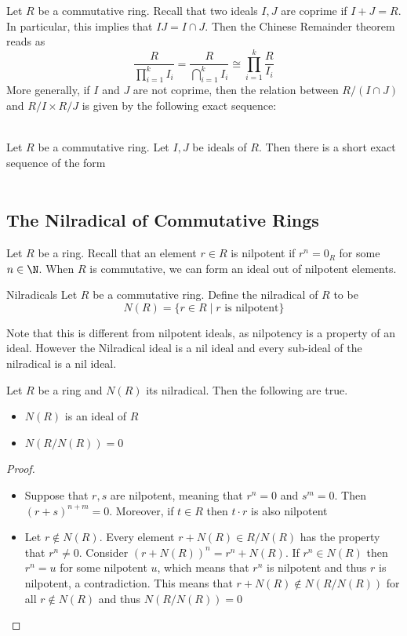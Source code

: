 \documentclass[a4paper]{article}
\begin{document}
Let $R$ be a commutative ring. Recall that two ideals $I,J$ are coprime if $I+J=R$. In particular, this implies that $IJ=I\cap J$. Then the Chinese Remainder theorem reads as $$\frac{R}{\prod_{i=1}^kI_i}=\frac{R}{\bigcap_{i=1}^kI_i}\cong\prod_{i=1}^k\frac{R}{I_i}$$ More generally, if $I$ and $J$ are not coprime, then the relation between $R/(I\cap J)$ and $R/I\times R/J$ is given by the following exact sequence: 

\begin{lmm}{}{}\\
Let $R$ be a commutative ring. Let $I,J$ be ideals of $R$. Then there is a short exact sequence of the form \\
\\
\end{lmm}

\subsection{The Nilradical of Commutative Rings}
Let $R$ be a ring. Recall that an element $r\in R$ is nilpotent if $r^n=0_R$ for some $n\in\N$. When $R$ is commutative, we can form an ideal out of nilpotent elements. 

\begin{defn}{Nilradicals}{} Let $R$ be a commutative ring. Define the nilradical of $R$ to be $$N(R)=\{r\in R\;|\;r\text{ is nilpotent}\}$$
\end{defn}

Note that this is different from nilpotent ideals, as nilpotency is a property of an ideal. However the Nilradical ideal is a nil ideal and every sub-ideal of the nilradical is a nil ideal. 

\begin{prp}{}{} Let $R$ be a ring and $N(R)$ its nilradical. Then the following are true. 
\begin{itemize}
\item $N(R)$ is an ideal of $R$
\item $N(R/N(R))=0$
\end{itemize}
\begin{proof}
\begin{itemize}
\item Suppose that $r,s$ are nilpotent, meaning that $r^n=0$ and $s^m=0$. Then $(r+s)^{n+m}=0$. Moreover, if $t\in R$ then $t\cdot r$ is also nilpotent
\item Let $r\notin N(R)$. Every element $r+N(R)\in R/N(R)$ has the property that $r^n\neq 0$. Consider $(r+N(R))^n=r^n+N(R)$. If $r^n\in N(R)$ then $r^n=u$ for some nilpotent $u$, which means that $r^n$ is nilpotent and thus $r$ is nilpotent, a contradiction. This means that $r+N(R)\notin N(R/N(R))$ for all $r\notin N(R)$ and thus $N(R/N(R))=0$
\end{itemize}
\end{proof}
\end{prp}
\end{document}
